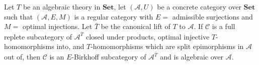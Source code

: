 Let $T$ be an algebraic theory in $\mathbf{Set}$, let $(\mathcal{A}, U)$ be a concrete category over $\mathbf{Set}$ such that $(\mathcal{A}, E, M)$ is a regular category with $E =$ admissible surjections and $M =$ optimal injections. Let $\bar{T}$ be the canonical lift of $T$ to $\mathcal{A}$. If $\mathcal{C}$ is a full replete subcategory of $\mathcal{A}^{\bar{T}}$ closed under products, optimal injective $T$-homomorphisms into, and $T$-homomorphisms which are split epimorphisms in $\mathcal{A}$ out of, then $\mathcal{C}$ is an $E$-Birkhoff subcategory of $\mathcal{A}^{\bar{T}}$ and is algebraic over $\mathcal{A}$.
